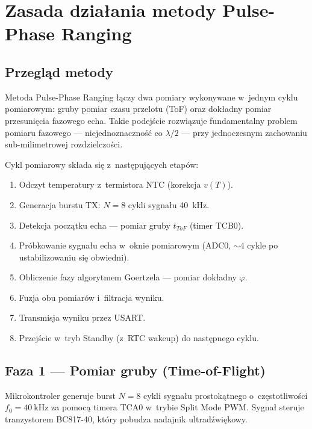 \documentclass[a4paper,11pt]{article}
\begin{document}
	
	\section{Zasada działania metody Pulse-Phase Ranging}
	\label{sec:zasada}
	
	\subsection{Przegląd metody}
	
	Metoda Pulse-Phase Ranging łączy dwa pomiary wykonywane w~jednym cyklu
	pomiarowym: gruby pomiar czasu przelotu (ToF) oraz dokładny pomiar przesunięcia
	fazowego echa. Takie podejście rozwiązuje fundamentalny problem pomiaru fazowego
	--- niejednoznaczność co $\lambda/2$ --- przy jednoczesnym zachowaniu sub-milimetrowej
	rozdzielczości.
	
	Cykl pomiarowy składa się z~następujących etapów:
	\begin{enumerate}[nosep]
		\item Odczyt temperatury z~termistora NTC (korekcja $v(T)$).
		\item Generacja burstu TX: $N = 8$ cykli sygnału \SI{40}{\kilo\hertz}.
		\item Detekcja początku echa --- pomiar gruby $t_{ToF}$ (timer TCB0).
		\item Próbkowanie sygnału echa w~oknie pomiarowym (ADC0, ${\sim}4$ cykle po ustabilizowaniu się obwiedni).
		\item Obliczenie fazy algorytmem Goertzela --- pomiar dokładny $\varphi$.
		\item Fuzja obu pomiarów i~filtracja wyniku.
		\item Transmisja wyniku przez USART.
		\item Przejście w~tryb Standby (z~RTC wakeup) do następnego cyklu.
	\end{enumerate}
	
	\subsection{Faza 1 --- Pomiar gruby (Time-of-Flight)}
	\label{sec:tof}
	
	Mikrokontroler generuje burst $N = 8$ cykli sygnału prostokątnego o~częstotliwości
	$f_0 = \SI{40}{\kilo\hertz}$ za pomocą timera TCA0 w~trybie Split Mode PWM. Sygnał
	steruje tranzystorem BC817-40, który pobudza nadajnik ultradźwiękowy.
	
\end{document}
